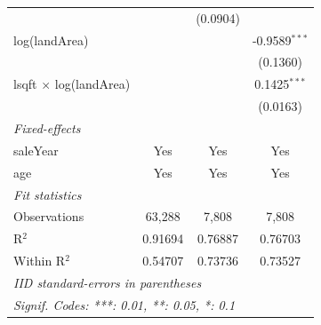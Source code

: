 \begin{tabular}{lccc}
                                                                                 &               & (0.0904)        &   \\   
   log(landArea)                                                                 &               &                 & -0.9589$^{***}$\\   
                                                                                 &               &                 & (0.1360)\\   
   lsqft $\times$ log(landArea)                                                  &               &                 & 0.1425$^{***}$\\   
                                                                                 &               &                 & (0.0163)\\   
   \midrule
   \emph{Fixed-effects}\\
   saleYear                                                                      & Yes           & Yes             & Yes\\  
   age                                                                           & Yes           & Yes             & Yes\\  
   \midrule
   \emph{Fit statistics}\\
   Observations                                                                  & 63,288        & 7,808           & 7,808\\  
   R$^2$                                                                         & 0.91694       & 0.76887         & 0.76703\\  
   Within R$^2$                                                                  & 0.54707       & 0.73736         & 0.73527\\  
   \midrule \midrule
   \multicolumn{4}{l}{\emph{IID standard-errors in parentheses}}\\
   \multicolumn{4}{l}{\emph{Signif. Codes: ***: 0.01, **: 0.05, *: 0.1}}\\
\end{tabular}
\par\endgroup


